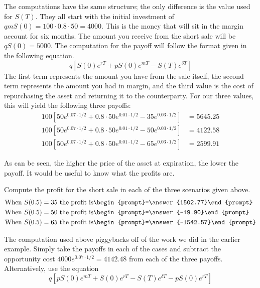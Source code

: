 \documentclass{ximera}
\begin{document}
\begin{solution}
The computations have the same structure; the only difference is the value used for $S(T)$. They all start with the initial investment of $qmS(0)=100\cdot 0.8\cdot 50=4000$. This is the money that will sit in the margin account for six months. The amount you receive from the short sale will be $qS(0)=5000$. The computation for the payoff will follow the format given in the following equation.
	\begin{equation*}
	q[S(0)e^{rT}+pS(0)e^{mT}-S(T)e^{\delta T}]
	\end{equation*}
The first term represents the amount you have from the sale itself, the second term represents the amount you had in margin, and the third value is the cost of repurchasing the asset and returning it to the counterparty. For our three values, this will yield the following three payoffs:
	\begin{align*}
	100[50e^{0.07\cdot 1/2}+0.8\cdot 50e^{0.01\cdot 1/2}-35e^{0.03\cdot 1/2}]&=5645.25\\
	100[50e^{0.07\cdot 1/2}+0.8\cdot 50e^{0.01\cdot 1/2}-50e^{0.03\cdot 1/2}]&=4122.58\\
	100[50e^{0.07\cdot 1/2}+0.8\cdot 50e^{0.01\cdot 1/2}-65e^{0.03\cdot 1/2}]&=2599.91
	\end{align*}
\end{solution}

As can be seen, the higher the price of the asset at expiration, the lower the payoff. It would be useful to know what the profits are.

\begin{question}
Compute the profit for the short sale in each of the three scenarios given above.
	\begin{align*}
	\text{When }S(0.5)=35\text{ the profit is}&\begin{prompt}=\answer{1502.77}\end{prompt}\\
	\text{When }S(0.5)=50\text{ the profit is}&\begin{prompt}=\answer{-19.90}\end{prompt}\\
	\text{When }S(0.5)=65\text{ the profit is}&\begin{prompt}=\answer{-1542.57}\end{prompt}
	\end{align*}
\end{question}

\begin{solution}
The computation used above piggybacks off of the work we did in the earlier example. Simply take the payoffs in each of the cases and subtract the opportunity cost $4000e^{0.07\cdot 1/2}=4142.48$ from each of the three payoffs. Alternatively, use the equation
	\begin{equation*}
	q[pS(0)e^{mT}+S(0)e^{rT}-S(T)e^{\delta T}-pS(0)e^{rT}]
	\end{equation*}
\end{solution}
\end{document}

